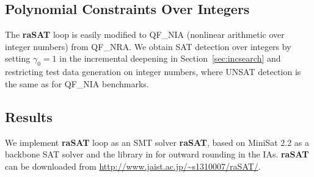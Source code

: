 \documentclass[runningheads,a4paper,oribibl]{llncs}
\begin{document}

\subsection{Polynomial Constraints Over Integers} \label{sec:NIA}

The {\bf raSAT} loop is easily modified to QF\_NIA (nonlinear arithmetic over
integer numbers) from QF\_NRA.
We obtain SAT detection over integers by setting $\gamma_0 = 1$ in
the incremental deepening in Section~\ref{sec:incsearch} 
and restricting test data generation on integer numbers,
where UNSAT detection is the same as for QF\_NIA benchmarks.

\subsection{Results} \label{sec:experiment}

We implement \textbf{raSAT} loop as an SMT solver {\bf raSAT}, 
based on MiniSat 2.2 as a backbone SAT solver and the library in \cite{Al2012.14} for
outward rounding in the IAs. \textbf{raSAT} can be downloaded from \url{http://www.jaist.ac.jp/~s1310007/raSAT/}.
\end{document}
